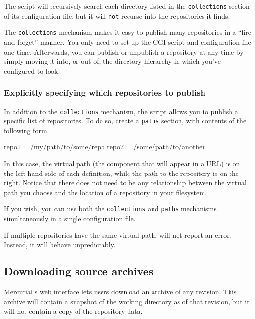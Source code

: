 The  script will recursively search each
directory listed in the \texttt{collections} section of its
configuration file, but it will \texttt{not} recurse into the
repositories it finds.

The \texttt{collections} mechanism makes it easy to publish many
repositories in a ``fire and forget'' manner.  You only need to set up
the CGI script and configuration file one time.  Afterwards, you can
publish or unpublish a repository at any time by simply moving it
into, or out of, the directory hierarchy in which you've configured
 to look.

\subsubsection{Explicitly specifying which repositories to publish}

In addition to the \texttt{collections} mechanism, the
 script allows you to publish a specific list
of repositories.  To do so, create a \texttt{paths} section, with
contents of the following form.
\begin{codesample2}
  [paths]
  repo1 = /my/path/to/some/repo
  repo2 = /some/path/to/another
\end{codesample2}
In this case, the virtual path (the component that will appear in a
URL) is on the left hand side of each definition, while the path to
the repository is on the right.  Notice that there does not need to be
any relationship between the virtual path you choose and the location
of a repository in your filesystem.

If you wish, you can use both the \texttt{collections} and
\texttt{paths} mechanisms simultaneously in a single configuration
file.

\begin{note}
  If multiple repositories have the same virtual path,
   will not report an error.  Instead, it will
  behave unpredictably.
\end{note}

\subsection{Downloading source archives}

Mercurial's web interface lets users download an archive of any
revision.  This archive will contain a snapshot of the working
directory as of that revision, but it will not contain a copy of the
repository data.

